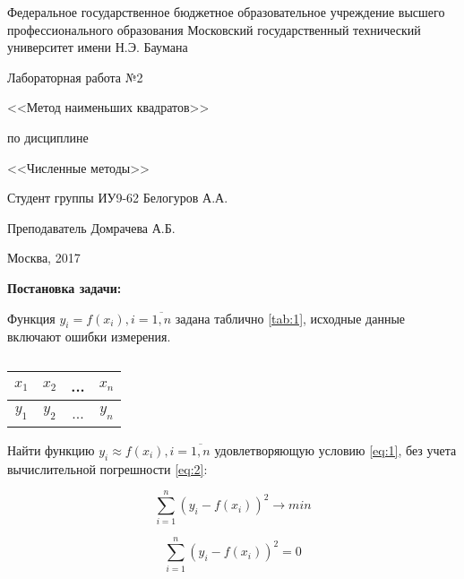 \documentclass[a4paper, 12pt]{article}   	%
\begin{document}
\begin{titlepage}

\thispagestyle{empty}

\begin{center}
Федеральное государственное бюджетное образовательное учреждение высшего профессионального образования Московский государственный технический университет имени Н.Э. Баумана
\end{center}


\vfill

\centerline{\large{Лабораторная работа №2}}
\centerline{\large{<<Метод наименьших квадратов>>}}
\centerline{\large{по дисциплине}}
\centerline{\large{<<Численные методы>>}}

\vfill

Студент группы ИУ9-62 \hfill Белогуров А.А.

Преподаватель \hfill Домрачева А.Б.
\vfill

\centerline{Москва, 2017}
\clearpage
\end{titlepage}

\newpage
\setcounter{page}{2}
 \textbf{Постановка задачи:}
 
 Функция $y_i = f(x_i),  i = \overline{1,n}$ задана таблично \eqref{tab:1}, исходные данные включают ошибки измерения.

\begin{table}[h]
\caption{\label{tab:1}}
\begin{center}
\begin{tabular}{|c|c|c|c|}
\hline
$x_1$ & $x_2$ & ... & $x_n$ \\
\hline
$y_1$ & $y_2$ & ... & $y_n$ \\
\hline
\end{tabular}
\end{center}
\end{table}

Найти функцию $y_i \approx f(x_i), i = \overline{1,n}$ удовлетворяющую условию \eqref{eq:1}, без учета вычислительной погрешности \eqref{eq:2}:

\begin{equation}\label{eq:1}
\sum_{i = 1}^{n} (y_i - f(x_i))^2 \to min
\end{equation}

\begin{equation}\label{eq:2}
\sum_{i = 1}^{n} (y_i - f(x_i))^2 = 0
\end{equation}
\\\\
\end{document}
